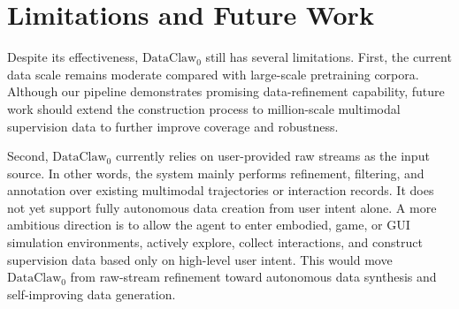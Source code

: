 \documentclass{llmxive}
\begin{document}


\section{Limitations and Future Work}
\label{app:limitations}
Despite its effectiveness, $\text{DataClaw}_0$ still has several limitations. First, the current data scale remains moderate compared with large-scale pretraining corpora. Although our pipeline demonstrates promising data-refinement capability, future work should extend the construction process to million-scale multimodal supervision data to further improve coverage and robustness.

Second, $\text{DataClaw}_0$ currently relies on user-provided raw streams as the input source. In other words, the system mainly performs refinement, filtering, and annotation over existing multimodal trajectories or interaction records. It does not yet support fully autonomous data creation from user intent alone. A more ambitious direction is to allow the agent to enter embodied, game, or GUI simulation environments, actively explore, collect interactions, and construct supervision data based only on high-level user intent. This would move $\text{DataClaw}_0$ from raw-stream refinement toward autonomous data synthesis and self-improving data generation.






\end{document}
